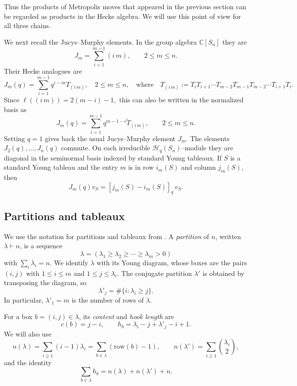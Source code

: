 \documentclass[11pt]{article}
\theoremstyle{plain}  %
\begin{document}
Thus the products of Metropolis moves that appeared in the previous section can
be regarded as products in the Hecke algebra. We will use this point of view for
all three chains.

We next recall the Jucys--Murphy elements. In the group algebra
$\mathbb C[S_n]$ they are
\[
J_m=\sum_{i=1}^{m-1}(i\,m),
\qquad 2\le m\le n.
\]
Their Hecke analogues are
\[
J_m(q)=\sum_{i=1}^{m-1}q^{i-m}T_{(i\,m)},
\quad 2\le m\le n,
\quad \text{where} \quad
T_{(i\,m)}
:=
T_iT_{i+1}\cdots T_{m-2}T_{m-1}
T_{m-2}\cdots T_{i+1}T_i.
\]
Since
$
\ell((i\,m))=2(m-i)-1,
$
this can also be written in the normalized basis as
\[
J_m(q)
=
\sum_{i=1}^{m-1}
q^{m-1-i}\widetilde T_{(i\,m)},
\qquad 2\le m\le n.
\]
Setting $q=1$ gives back the usual Jucys--Murphy element $J_m$. The elements $J_2(q),\ldots,J_n(q)$ commute. On each irreducible
$\mathcal H_q(S_n)$--module they are diagonal in the seminormal basis indexed by
standard Young tableaux. If $S$ is a standard Young tableau and the entry $m$ is
in row $i_m(S)$ and column $j_m(S)$, then
\[
J_m(q)v_S
=
[j_m(S)-i_m(S)]_q\,v_S.
\]




\subsection{Partitions and tableaux}\label{sec:tableaux}

We use the notation for partitions and tableaux from \cite{Sagan2001}. A
\emph{partition} of $n$, written $\lambda\vdash n$, is a sequence
\[
    \lambda=(\lambda_1\geq\lambda_2\geq\cdots\geq\lambda_m>0)
\]
with $\sum_i\lambda_i=n$. We identify $\lambda$ with its Young diagram, whose
boxes are the pairs $(i,j)$ with $1\leq i\leq m$ and $1\leq j\leq\lambda_i$.
The conjugate partition $\lambda'$ is obtained by transposing the diagram, so
\[
    \lambda'_j=\#\{i:\lambda_i\geq j\}.
\]
In particular, $\lambda'_1=m$ is the number of rows of $\lambda$.

For a box $b=(i,j)\in\lambda$, its \emph{content} and \emph{hook length} are
\[
    c(b)=j-i,
    \qquad
    h_b=\lambda_i-j+\lambda'_j-i+1.
\]
We will also use
\[
    n(\lambda)=\sum_{i\geq1}(i-1)\lambda_i
              =\sum_{b\in\lambda}(\mathrm{row}(b)-1),
    \qquad
    n(\lambda')=\sum_{i\geq1}\binom{\lambda_i}{2},
\]
and the identity
\[
    \sum_{b\in\lambda}h_b=n(\lambda)+n(\lambda')+n.
\]
\end{document}
